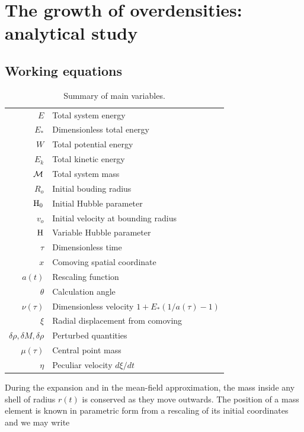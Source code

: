\section{The growth of overdensities: analytical study}



\subsection{Working equations}



\begin{table}
\begin{center}
\caption{Summary of main variables.}
\label{Tab:identities}
\begin{tabularx}{0.7\textwidth}{rl}
\hline
$E$ & Total system energy \\
$E_*$ & Dimensionless total energy \\
$W$ & Total potential energy \\
$E_k$ & Total kinetic energy\\
$\cal M$ & Total system mass\\
$R_o$ & Initial bouding radius\\
${\textrm{H}}_0$ & Initial Hubble parameter\\
$v_o$ & Initial velocity at bounding radius\\
${\textrm{H}}$ & Variable Hubble parameter\\
$\tau$ & Dimensionless time\\
$x$ & Comoving spatial coordinate\\
$a(t)$ & Rescaling function\\
$\theta$ & Calculation angle\\
$\nu(\tau)$ & Dimensionless velocity $1 + E_*(1/a(\tau)-1)$\\
$\xi$ & Radial displacement from comoving \\
$\delta\rho,\delta M,\delta\rho$ & Perturbed quantities\\
$\mu(\tau)$ & Central point mass\\
$\eta$ & Peculiar velocity $d\xi/dt$\\
\hline
\end{tabularx}
\end{center}
\end{table}

During the expansion and in the mean-field approximation, the mass inside any shell of radius $r(t)$ is conserved as they move outwards. The position of a mass element is known in parametric form from a rescaling of its initial coordinates and we may write 

